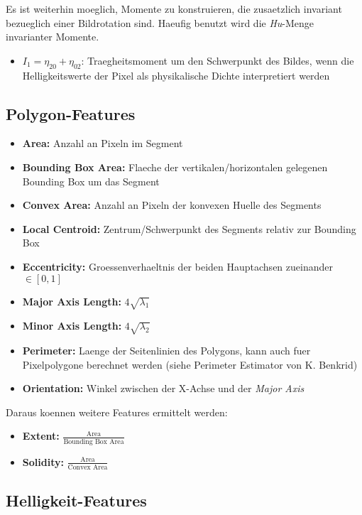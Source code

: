 Es ist weiterhin moeglich, Momente zu konstruieren, die zusaetzlich invariant bezueglich einer Bildrotation sind.
Haeufig benutzt wird die \emph{Hu}-Menge invarianter Momente.

\begin{itemize}
  \item $I_1 = \eta_{20} + \eta_{02}$: Traegheitsmoment um den Schwerpunkt des Bildes, wenn die Helligkeitswerte der Pixel als physikalische Dichte interpretiert werden
\end{itemize}

\subsection{Polygon-Features}

\begin{itemize}
  \item \textbf{Area:} Anzahl an Pixeln im Segment
  \item \textbf{Bounding Box Area:} Flaeche der vertikalen/horizontalen gelegenen Bounding Box um das Segment
  \item \textbf{Convex Area:} Anzahl an Pixeln der konvexen Huelle des Segments
  \item \textbf{Local Centroid:} Zentrum/Schwerpunkt des Segments relativ zur Bounding Box
  \item \textbf{Eccentricity:} Groessenverhaeltnis der beiden Hauptachsen zueinander $\in [0, 1]$
  \item \textbf{Major Axis Length:} $4 \sqrt{\lambda_1}$
  \item \textbf{Minor Axis Length:} $4 \sqrt{\lambda_2}$
  \item \textbf{Perimeter:} Laenge der Seitenlinien des Polygons, kann auch fuer Pixelpolygone berechnet werden (siehe Perimeter Estimator von K. Benkrid)
  \item \textbf{Orientation:} Winkel zwischen der X-Achse und der \emph{Major Axis}
\end{itemize}

Daraus koennen weitere Features ermittelt werden:

\begin{itemize}
  \item \textbf{Extent:} $\frac{\text{Area}}{\text{Bounding Box Area}}$
  \item \textbf{Solidity:} $\frac{\text{Area}}{\text{Convex Area}}$
\end{itemize}

\subsection{Helligkeit-Features}

